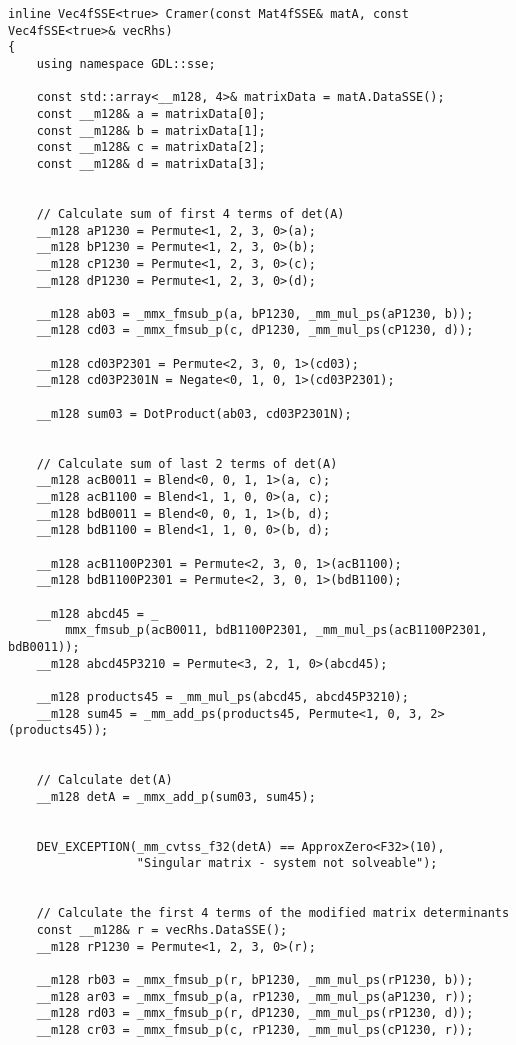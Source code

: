 \begin{verbatim}
inline Vec4fSSE<true> Cramer(const Mat4fSSE& matA, const Vec4fSSE<true>& vecRhs)
{
    using namespace GDL::sse;

    const std::array<__m128, 4>& matrixData = matA.DataSSE();
    const __m128& a = matrixData[0];
    const __m128& b = matrixData[1];
    const __m128& c = matrixData[2];
    const __m128& d = matrixData[3];


    // Calculate sum of first 4 terms of det(A)
    __m128 aP1230 = Permute<1, 2, 3, 0>(a);
    __m128 bP1230 = Permute<1, 2, 3, 0>(b);
    __m128 cP1230 = Permute<1, 2, 3, 0>(c);
    __m128 dP1230 = Permute<1, 2, 3, 0>(d);

    __m128 ab03 = _mmx_fmsub_p(a, bP1230, _mm_mul_ps(aP1230, b));
    __m128 cd03 = _mmx_fmsub_p(c, dP1230, _mm_mul_ps(cP1230, d));

    __m128 cd03P2301 = Permute<2, 3, 0, 1>(cd03);
    __m128 cd03P2301N = Negate<0, 1, 0, 1>(cd03P2301);

    __m128 sum03 = DotProduct(ab03, cd03P2301N);


    // Calculate sum of last 2 terms of det(A)
    __m128 acB0011 = Blend<0, 0, 1, 1>(a, c);
    __m128 acB1100 = Blend<1, 1, 0, 0>(a, c);
    __m128 bdB0011 = Blend<0, 0, 1, 1>(b, d);
    __m128 bdB1100 = Blend<1, 1, 0, 0>(b, d);

    __m128 acB1100P2301 = Permute<2, 3, 0, 1>(acB1100);
    __m128 bdB1100P2301 = Permute<2, 3, 0, 1>(bdB1100);

    __m128 abcd45 = _
        mmx_fmsub_p(acB0011, bdB1100P2301, _mm_mul_ps(acB1100P2301, bdB0011));
    __m128 abcd45P3210 = Permute<3, 2, 1, 0>(abcd45);

    __m128 products45 = _mm_mul_ps(abcd45, abcd45P3210);
    __m128 sum45 = _mm_add_ps(products45, Permute<1, 0, 3, 2>(products45));


    // Calculate det(A)
    __m128 detA = _mmx_add_p(sum03, sum45);


    DEV_EXCEPTION(_mm_cvtss_f32(detA) == ApproxZero<F32>(10), 
                  "Singular matrix - system not solveable");


    // Calculate the first 4 terms of the modified matrix determinants
    const __m128& r = vecRhs.DataSSE();
    __m128 rP1230 = Permute<1, 2, 3, 0>(r);

    __m128 rb03 = _mmx_fmsub_p(r, bP1230, _mm_mul_ps(rP1230, b));
    __m128 ar03 = _mmx_fmsub_p(a, rP1230, _mm_mul_ps(aP1230, r));
    __m128 rd03 = _mmx_fmsub_p(r, dP1230, _mm_mul_ps(rP1230, d));
    __m128 cr03 = _mmx_fmsub_p(c, rP1230, _mm_mul_ps(cP1230, r));


\end{verbatim}
